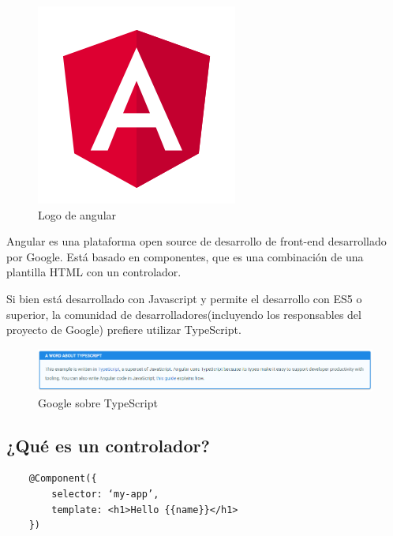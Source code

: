 \documentclass[openright,twoside,10pt]{book}
\begin{document}
    \begin{figure}[H]
        \begin{center}
            \includegraphics[scale=0.6]{img/angular.png}
        \end{center}
        \caption{Logo de angular}
    \end{figure}
    
    Angular es una plataforma open source de desarrollo de front-end
    desarrollado por Google. Está basado en componentes, que es una
    combinación de una plantilla HTML con un controlador.
    
    Si bien está desarrollado con Javascript y permite el desarrollo con ES5
    o superior, la comunidad de desarrolladores(incluyendo los responsables
    del proyecto de Google) prefiere utilizar TypeScript.
    
    \begin{figure}[H]
        \begin{center}
            \includegraphics[width=\textwidth]{img/aboutTypescript.png}
        \end{center}
        \caption{Google sobre TypeScript}
    \end{figure}
    
    \subsection{¿Qué es un controlador?}\label{quuxe9-es-un-controlador}
    
    \begin{verbatim}
    @Component({
        selector: ‘my-app’,
        template: <h1>Hello {{name}}</h1>
    })
    \end{verbatim}
    
\end{document}
